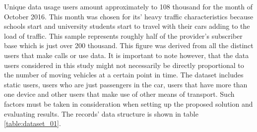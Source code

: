 \documentclass[12pt, a4paper]{report}
\theoremstyle{definition}
\theoremstyle{definition}%
\theoremstyle{definition}%
\theoremstyle{definition}%
\theoremstyle{definition}%
\theoremstyle{definition}%
\begin{document}
Unique data usage users amount approximately to 108 thousand for the month of October 2016. This month was chosen for its' heavy traffic characteristics because schools start and university students start to travel with their cars adding to the load of traffic. This sample represents roughly half of the provider's subscriber base which is just over 200 thousand. This figure was derived from all the distinct users that make calls or use data. It is important to note however, that the data users considered in this study might not necessarily be directly proportional to the number of moving vehicles at a certain point in time. The dataset includes static users, users who are just passengers in the car, users that have more than one device and other users that make use of other means of transport. Such factors must be taken in consideration when setting up the proposed solution and evaluating results. The records' data structure is shown in table \ref{table:dataset_01}.


\begin{table}[h] 
    \centering
\caption{Description of data fields in the mobile usage raw dataset} 
\label{table:dataset_01}
\end{table}
\end{document}
